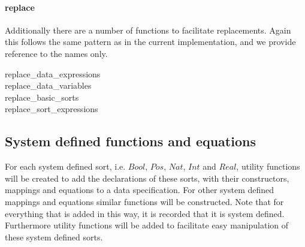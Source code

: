 \documentclass[a4paper,11pt]{article}
\begin{document}
\paragraph{replace}
Additionally there are a number of functions to facilitate replacements. Again this follows the same pattern as in the current implementation, and we provide reference to the names only.

\begin{description}
  \item[replace\_data\_expressions]
  \item[replace\_data\_variables]
  \item[replace\_basic\_sorts]
  \item[replace\_sort\_expressions]
\end{description}

\subsection{System defined functions and equations}
For each system defined sort, i.e. $Bool$, $Pos$, $Nat$, $Int$ and $Real$, utility functions will be created to add the declarations of these sorts, with their constructors, mappings and equations to a data specification. For other system defined mappings and equations similar functions will be constructed. Note that for everything that is added in this way, it is recorded that it is system defined. Furthermore utility functions will be added to facilitate easy manipulation of these system defined sorts.



%
%
%
\end{document}
